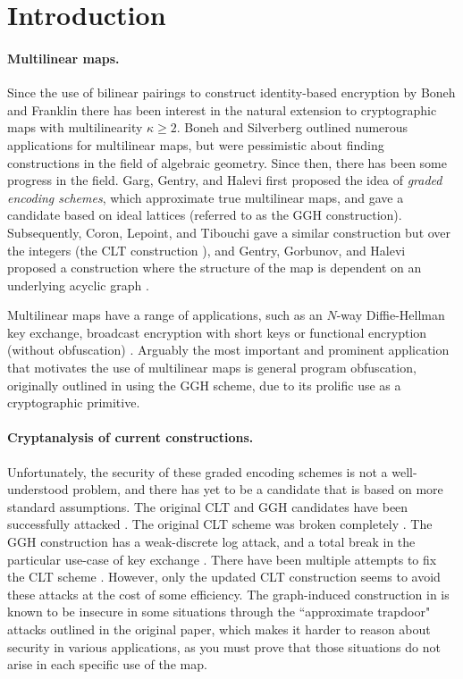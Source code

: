 \section{Introduction}

\paragraph{Multilinear maps.} Since the use of bilinear pairings to construct identity-based encryption by Boneh and Franklin \cite{bf} there has been interest in the natural extension to cryptographic maps with multilinearity $\kappa \geq 2$.  Boneh and Silverberg \cite{bs} outlined numerous applications for multilinear maps, but were pessimistic about finding constructions in the field of algebraic geometry.  Since then, there has been some progress in the field.  Garg, Gentry, and Halevi \cite{ggh13a} first proposed the idea of \textit{graded encoding schemes}, which approximate true multilinear maps, and gave a candidate based on ideal lattices (referred to as the GGH construction).  Subsequently, Coron, Lepoint, and Tibouchi gave a similar construction but over the integers (the CLT construction \cite{clt, clt15}), and Gentry, Gorbunov, and Halevi proposed a construction where the structure of the map is dependent on an underlying acyclic graph \cite{ggh14a}.

Multilinear maps have a range of applications, such as an $N$-way Diffie-Hellman key exchange, broadcast encryption with short keys \cite{bs} or functional encryption (without obfuscation) \cite{blr}.  Arguably the most important and prominent application that motivates the use of multilinear maps is general program obfuscation, originally outlined in \cite{ggh13b} using the GGH scheme, due to its prolific use as a cryptographic primitive.

\paragraph{Cryptanalysis of current constructions.}  Unfortunately, the security of these graded encoding schemes is not a well-understood problem, and there has yet to be a candidate that is based on more standard assumptions.  The original CLT and GGH candidates have been successfully attacked \cite{chl, cgh, hj}.  The original CLT scheme was broken completely \cite{chl, cgh}.  The GGH construction has a weak-discrete log attack, and a total break in the particular use-case of key exchange \cite{cgh, hj}.  There have been multiple attempts to fix the CLT scheme \cite{bwz, clt14, clt15}.  However, only the updated CLT construction \cite{clt15} seems to avoid these attacks at the cost of some efficiency.  The graph-induced construction in \cite{ggh14a} is known to be insecure in some situations through the ``approximate trapdoor" attacks outlined in the original paper, which makes it harder to reason about security in various applications, as you must prove that those situations do not arise in each specific use of the map.

